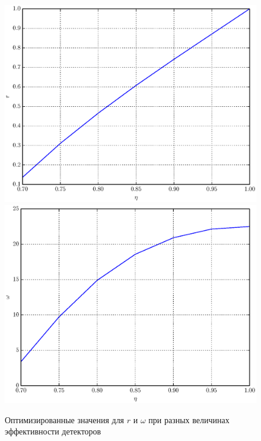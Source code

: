 \documentclass[%
master,         %
subf,           %
href,           %
colorlinks=true %
]{disser}
\numberwithin{equation}{section}
\numberwithin{figure}{section}
\begin{document}
\begin{figure}[h]
\includegraphics[scale=0.7]{r.eps}
\includegraphics[scale=0.7]{omega.eps}
\caption{Оптимизированные значения для $r$ и $\omega$ при разных величинах эффективности детекторов}
\label{fig:psi_opt}
\end{figure}
\end{document}
